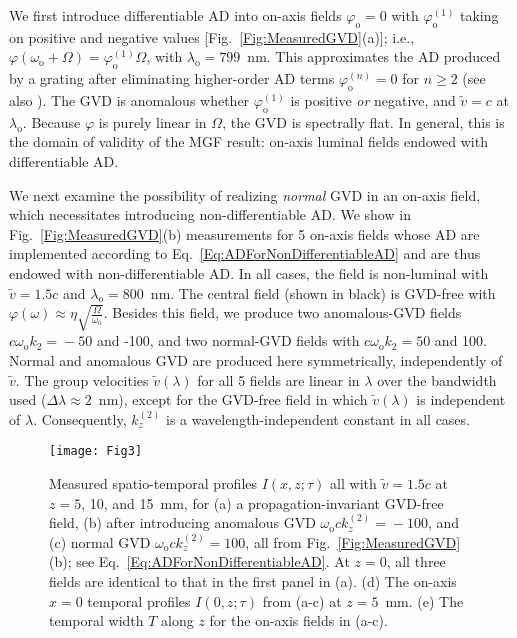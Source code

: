 \documentclass[reprint,
 amsmath,amssymb,
 aps,
]{revtex4-2}
\begin{document}
We first introduce differentiable AD into on-axis fields $\varphi_{\mathrm{o}}\!=\!0$ with $\varphi_{\mathrm{o}}^{(1)}$ taking on positive and negative values [Fig.~\ref{Fig:MeasuredGVD}(a)]; i.e., $\varphi(\omega_{\mathrm{o}}+\Omega)\!=\!\varphi_{\mathrm{o}}^{(1)}\Omega$, with $\lambda_{\mathrm{o}}\!=\!799$~nm. This approximates the AD produced by a grating after eliminating higher-order AD terms $\varphi_{\mathrm{o}}^{(n)}\!=\!0$ for $n\!\geq\!2$ (see also \cite{Hall21PRA,Hall21APLP}). The GVD is anomalous whether $\varphi_{\mathrm{o}}^{(1)}$ is positive \textit{or} negative, and $\widetilde{v}\!=\!c$ at $\lambda_{\mathrm{o}}$. Because $\varphi$ is purely linear in $\Omega$, the GVD is spectrally flat. In general, this is the domain of validity of the MGF result: on-axis luminal fields endowed with differentiable AD.

We next examine the possibility of realizing \textit{normal} GVD in an on-axis field, which necessitates introducing non-differentiable AD. We show in Fig.~\ref{Fig:MeasuredGVD}(b) measurements for 5 on-axis fields whose AD are implemented according to Eq.~\ref{Eq:ADForNonDifferentiableAD} and are thus endowed with non-differentiable AD. In all cases, the field is non-luminal with $\widetilde{v}\!=\!1.5c$ and $\lambda_{\mathrm{o}}\!=\!800$~nm. The central field (shown in black) is GVD-free with $\varphi(\omega)\!\approx\!\eta\sqrt{\tfrac{\Omega}{\omega_{\mathrm{o}}}}$. Besides this field, we produce two anomalous-GVD fields $c\omega_{\mathrm{o}}k_{2}\!=\!-50$ and -100, and two normal-GVD fields with $c\omega_{\mathrm{o}}k_{2}\!=\!50$ and 100. Normal and anomalous GVD are produced here symmetrically, independently of $\widetilde{v}$. The group velocities $\widetilde{v}(\lambda)$ for all 5 fields are linear in $\lambda$ over the bandwidth used ($\Delta\lambda\!\approx\!2$~nm), except for the GVD-free field in which $\widetilde{v}(\lambda)$ is independent of $\lambda$. Consequently, $k_{z}^{(2)}$ is a wavelength-independent constant in all cases.

\begin{figure}[t!]
\centering
\texttt{[image: Fig3]}
\caption{Measured spatio-temporal profiles $I(x,z;\tau)$ all with $\widetilde{v}\!=\!1.5c$ at $z\!=\!5$, 10, and 15~mm, for (a) a propagation-invariant GVD-free field, (b) after introducing anomalous GVD $\omega_{\mathrm{o}}ck_{z}^{(2)}\!=\!-100$, and (c) normal GVD $\omega_{\mathrm{o}}ck_{z}^{(2)}\!=\!100$, all from Fig.~\ref{Fig:MeasuredGVD}(b); see Eq.~\ref{Eq:ADForNonDifferentiableAD}. At $z\!=\!0$, all three fields are identical to that in the first panel in (a). (d) The on-axis $x\!=\!0$ temporal profiles $I(0,z;\tau)$ from (a-c) at $z\!=\!5$~mm. (e) The temporal width $T$ along $z$ for the on-axis fields in (a-c).}
\label{Fig:Temporal}
\end{figure}
\end{document}
